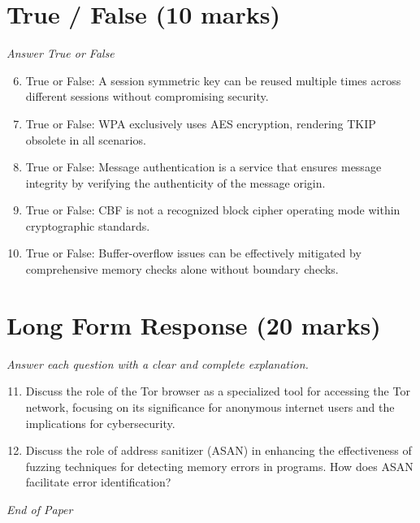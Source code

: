 \documentclass[12pt]{article}
\begin{document}
\section*{True / False (10 marks)}
\textit{Answer True or False}
\begin{enumerate}[label=\arabic*.]
\setcounter{enumi}{5}
\item True or False: A session symmetric key can be reused multiple times across different sessions without compromising security.
\item True or False: WPA exclusively uses AES encryption, rendering TKIP obsolete in all scenarios.
\item True or False: Message authentication is a service that ensures message integrity by verifying the authenticity of the message origin.
\item True or False: CBF is not a recognized block cipher operating mode within cryptographic standards.
\item True or False: Buffer-overflow issues can be effectively mitigated by comprehensive memory checks alone without boundary checks.
\end{enumerate}

\section*{Long Form Response (20 marks)}
\textit{Answer each question with a clear and complete explanation.}
\begin{enumerate}[label=\arabic*.]
\setcounter{enumi}{10}
\item Discuss the role of the Tor browser as a specialized tool for accessing the Tor network, focusing on its significance for anonymous internet users and the implications for cybersecurity.
\item Discuss the role of address sanitizer (ASAN) in enhancing the effectiveness of fuzzing techniques for detecting memory errors in programs. How does ASAN facilitate error identification?
\end{enumerate}

\vfill
\noindent\textit{End of Paper}
\end{document}
